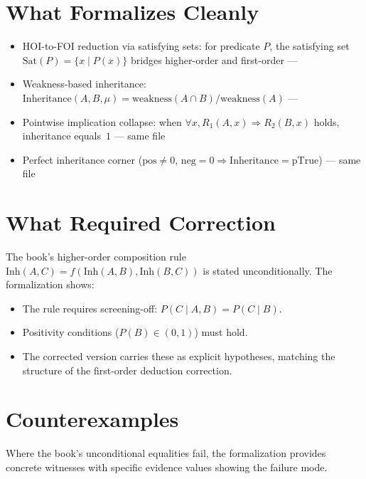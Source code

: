 \documentclass[11pt,openany]{report}
\begin{document}
\section{What Formalizes Cleanly}

\begin{itemize}
\item HOI-to-FOI reduction via satisfying sets: for predicate $P$, the
  satisfying set $\mathrm{Sat}(P) = \{x \mid P(x)\}$ bridges
  higher-order and first-order ---
\item Weakness-based inheritance:
  $\mathrm{Inheritance}(A, B, \mu) = \mathrm{weakness}(A \cap B) / \mathrm{weakness}(A)$
  ---
\item Pointwise implication collapse: when $\forall x, R_1(A,x) \Rightarrow R_2(B,x)$
  holds, inheritance equals~$1$ ---
  same file
\item Perfect inheritance corner ($\mathrm{pos} \ne 0$, $\mathrm{neg} = 0
  \Rightarrow \mathrm{Inheritance} = \mathrm{pTrue}$) ---
  same file
\end{itemize}

\section{What Required Correction}

The book's higher-order composition rule
$\mathrm{Inh}(A,C) = f(\mathrm{Inh}(A,B), \mathrm{Inh}(B,C))$ is
stated unconditionally.  The formalization shows:
\begin{itemize}
\item The rule requires screening-off: $P(C \mid A, B) = P(C \mid B)$.
\item Positivity conditions ($P(B) \in (0,1)$) must hold.
\item The corrected version carries these as explicit hypotheses, matching
  the structure of the first-order deduction correction.
\end{itemize}

\section{Counterexamples}

Where the book's unconditional equalities fail, the formalization provides
concrete witnesses with specific evidence values showing the failure mode.
\end{document}
